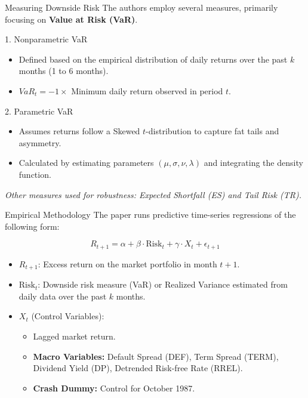 \documentclass{beamer}
\begin{document}
\begin{frame}{Measuring Downside Risk}
    The authors employ several measures, primarily focusing on \textbf{Value at Risk (VaR)}.

    \begin{block}{1. Nonparametric VaR}
        \begin{itemize}
            \item Defined based on the empirical distribution of daily returns over the past $k$ months (1 to 6 months).
            \item $VaR_t = -1 \times$ Minimum daily return observed in period $t$.
        \end{itemize}
    \end{block}

    \begin{block}{2. Parametric VaR}
        \begin{itemize}
            \item Assumes returns follow a Skewed $t$-distribution to capture fat tails and asymmetry.
            \item Calculated by estimating parameters $(\mu, \sigma, \nu, \lambda)$ and integrating the density function.
        \end{itemize}
    \end{block}

    \textit{Other measures used for robustness: Expected Shortfall (ES) and Tail Risk (TR).}
\end{frame}

\begin{frame}{Empirical Methodology}
    The paper runs predictive time-series regressions of the following form:

    \begin{equation}
        R_{t+1} = \alpha + \beta \cdot \text{Risk}_t + \gamma \cdot X_t + \epsilon_{t+1}
    \end{equation}

    \begin{itemize}
        \item $R_{t+1}$: Excess return on the market portfolio in month $t+1$.
        \item $\text{Risk}_t$: Downside risk measure (VaR) or Realized Variance estimated from daily data over the past $k$ months.
        \item $X_t$ (Control Variables):
            \begin{itemize}
                \item Lagged market return.
                \item \textbf{Macro Variables:} Default Spread (DEF), Term Spread (TERM), Dividend Yield (DP), Detrended Risk-free Rate (RREL).
                \item \textbf{Crash Dummy:} Control for October 1987.
            \end{itemize}
    \end{itemize}
\end{frame}
\end{document}
